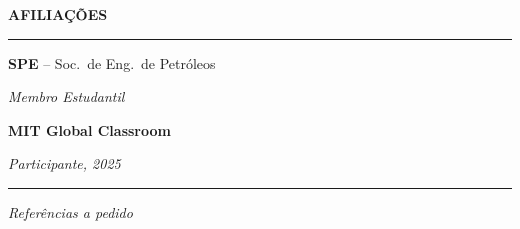 \documentclass[10pt,a4paper]{article}
\newcommand{\sideSection}[1]{%
  \vspace{2pt}%
  {\bfseries\color{sidetext}\small\MakeUppercase{#1}}%
  \par\vspace{1pt}%
  {\color{goldrule}\rule{\linewidth}{0.55pt}}%
  \par\vspace{1pt}%
}
\begin{document}
\begin{minipage}[t]{0.283\paperwidth}
\begin{minipage}[t]{\dimexpr\linewidth-18pt}
    \sideSection{Afiliações}
    {\small
      \textbf{\color{white}SPE} \color{sidetext}-- Soc.\ de Eng.\ de Petróleos\par
      \textit{\color{goldrule!80}Membro Estudantil}\par\vspace{2pt}
      \textbf{\color{white}MIT Global Classroom}\par
      \textit{\color{goldrule!80}Participante, 2025}\par
    }

    \vspace{4pt}
    \begin{center}
      {\color{goldrule}\rule{0.55\linewidth}{0.4pt}}\par\vspace{2pt}
      {\color{sidetext!60}\small\itshape Referências a pedido}
    \end{center}

  \end{minipage}
\end{minipage}%
%
\hspace*{10pt}%
\end{document}
